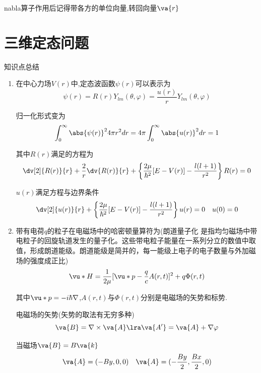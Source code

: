             nabla算子作用后记得带各方的单位向量,转回向量$\va{r}$









    \section{三维定态问题}
            \begin{formal}
                知识点总结
                
                \begin{enumerate}
                    \item 在中心力场$V(r)$中,定态波函数$\psi(r)$可以表示为
                    $$ \psi(r) = R(r) Y_{lm}(\theta,\varphi) = \frac{u(r)}{r}Y_{lm}(\theta,\varphi) $$

                    归一化形式变为
                    $$ \int_{0}^{\infty} \abs{\psi(r)}^{2} 4\pi r^{2} dr = 4 \pi \int_{0}^{\infty}\abs{u(r)}^{2} dr = 1 $$
                    
                    其中$R(r)$满足的方程为
                    $$ \dv[2]{R(r)}{r} + \frac{2}{r} \dv{R(r)}{r} + \left\{ \frac{2\mu}{\hbar^{2}}[E-V(r)] - \frac{l(l+1)}{r^{2}} \right\}   R(r)  = 0 $$

                    $u(r)$满足方程与边界条件
                    $$ \dv[2]{u(r)}{r} + \left\{   \frac{2\mu}{\hbar^{2}}[E-V(r)] - \frac{l(l+1)}{r^{2}} \right\} u(r) = 0 \quad u(0) = 0 $$

                    \item 带有电荷$q$的粒子在电磁场中的哈密顿量算符为(朗道量子化
                    是指均匀磁场中带电粒子的回旋轨道发生的量子化。这些带电粒子能量在一系列分立的数值中取值，形成朗道能级。朗道能级是简并的，每一能级上电子的电子数量与外加磁场的强度成正比)
                    $$ \vu*{H} = \frac{1}{2\mu} [\vu*{p} - \frac{q}{c} A(r,t) ]^{2} + q \Phi(r,t) $$

                    其中$\vu*{p} = -i\hbar \nabla$,$A(r,t)$与$\Phi(r,t)$分别是电磁场的矢势和标势.

                    电磁场的矢势(矢势的取法有无穷多种)
                    $$ \va{B} = \nabla \times \va{A}  \lra  \va{A'} = \va{A} + \nabla \varphi $$

                    当磁场$ \va{B} = B \va{k} $
                    $$ \va{A} = (-By,0,0) \quad \va{A} = (-\frac{By}{2},\frac{Bx}{2},0) $$
                    

\end{enumerate}
\end{formal}
